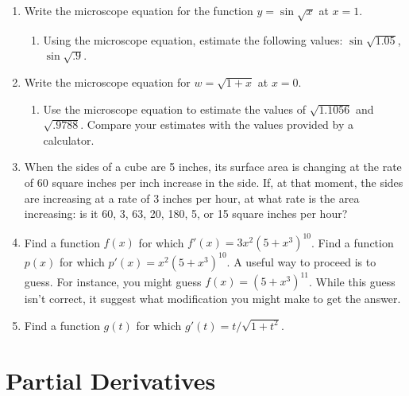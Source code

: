 \begin{enumerate}
\begin{enumerate}
  \item At what point is the graph of $y = 1/(3x^2 - 5x + 7)$ rising most
steeply?  Describe how you determined the location of this point.



\end{enumerate}
\item Write the microscope equation for the function $y =
\sin{\sqrt{x}}$ at $x = 1$.

  \begin{enumerate}
  \item Using the microscope equation, estimate the following values:
$\sin{\sqrt{1.05}}$, $\sin{\sqrt{.9}}$.



\end{enumerate}
\item Write the microscope equation for $w = \sqrt{1 + x}$ at $x = 0$.

  \begin{enumerate}
  \item Use the microscope equation to estimate the values of
$\sqrt{1.1056}$ and $\sqrt{.9788}$.  Compare your estimates with the
values provided by a calculator.




\end{enumerate}
\item When the sides of a cube are 5 inches, its surface area is
changing at the rate of 60 square inches per inch increase in the
side.  If, at that moment, the sides are increasing at a rate of 3
inches per hour, at what rate is the area increasing: is it 60, 3, 63,
20, 180, 5, or 15 square inches per hour?



\item Find a function $f(x)$ for which $f'(x) = 3x^2(5 + x^3)^{10}$.
Find a function $p(x)$ for which $p'(x) = x^2(5 + x^3)^{10}$.  A
useful way to proceed is to guess.  For instance, you might guess
$f(x)=(5+x^3)^{11}$.  While this guess isn't correct, it suggest what
modification you might make to get the answer.



\item Find a function $g(t)$ for which $g'(t) = t/\sqrt{1 + t^2}$.



\end{enumerate}
\section{Partial Derivatives} 
\label{sec:partial-derivatives}

